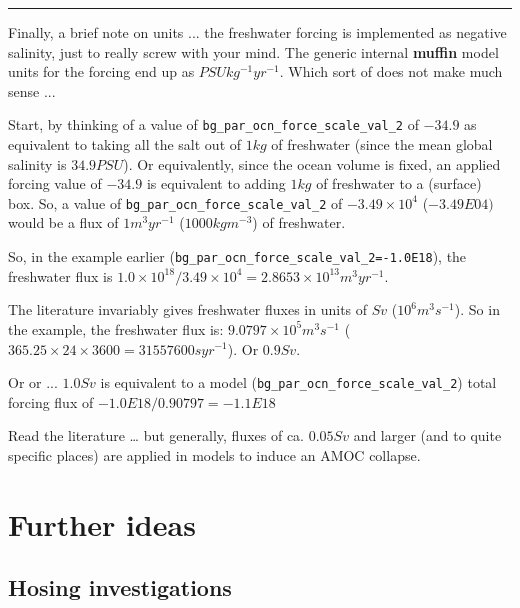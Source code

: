 \vspace{1mm}
\noindent\rule{4cm}{0.5pt}
\vspace{2mm}

\noindent Finally, a brief note on units ... the freshwater forcing is implemented as negative salinity, just to really screw with your mind. The generic internal \textbf{muffin} model units for the forcing end up as \(PSU kg^{-1} yr^{-1}\). Which sort of does not make much sense ...

Start, by thinking of a value of \texttt{bg\_par\_ocn\_force\_scale\_val\_2} of \(-34.9\) as equivalent to taking all the salt out of \(1 kg\) of freshwater (since the mean global salinity is \(34.9 PSU\)). Or equivalently, since the ocean volume is fixed, an applied forcing value of \(-34.9\) is equivalent to adding \(1 kg\) of freshwater to a (surface) box. So, a value of \texttt{bg\_par\_ocn\_force\_scale\_val\_2} of \(-3.49\times10^{4}\) (\(-3.49E04)\) would be a flux of \(1 m^{3} yr^{-1}\) (\(1000 kg m^{-3}\)) of freshwater.

So, in the example earlier (\texttt{bg\_par\_ocn\_force\_scale\_val\_2=-1.0E18}), the freshwater flux is \(1.0\times10^{18}/3.49\times10^{4} = 2.8653\times10^{13} m^{3} yr^{-1}\).

The literature invariably gives freshwater fluxes in units of \(Sv\) (\(10^{6} m^{3} s^{-1}\)). So in the example, the freshwater flux is: \(9.0797\times10^{5} m^{3} s^{-1}\) (\(365.25\times24\times3600 = 31557600 s yr^{-1}\)). Or \(0.9 Sv\).

Or or ... \(1.0 Sv\) is equivalent to a model (\texttt{bg\_par\_ocn\_force\_scale\_val\_2}) total forcing flux of \(-1.0E18/0.90797 = -1.1E18\)

Read the literature … but generally, fluxes of ca. \(0.05 Sv\) and larger (and to quite specific places) are applied in models to induce an AMOC collapse.

\newpage

\section{Further ideas}


\subsection{Hosing investigations}

